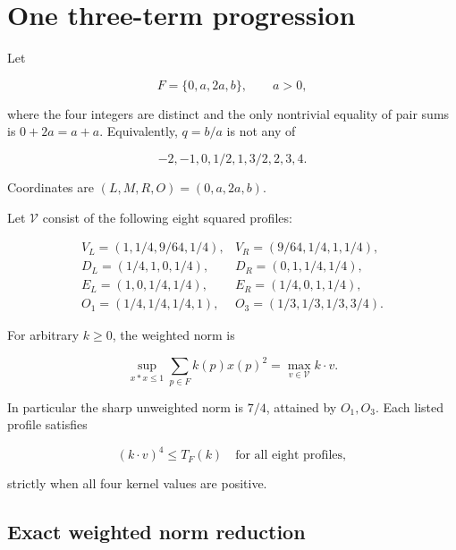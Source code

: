 \section{One three-term progression}
\label{sec:isolated}
Let

\[
F=\{0,a,2a,b\},\qquad a>0,
\]

where the four integers are distinct and the only nontrivial equality of pair
sums is \(0+2a=a+a\). Equivalently, \(q=b/a\) is not any of

\begin{equation}\label{eq:i1}
-2,-1,0,1/2,1,3/2,2,3,4.
\end{equation}

Coordinates are \((L,M,R,O)=(0,a,2a,b)\).

Let \(\mathcal V\) consist of the following eight squared profiles:

\begin{equation}\label{eq:i2}
\begin{array}{ll}
V_L=(1,1/4,9/64,1/4),&V_R=(9/64,1/4,1,1/4),\\
D_L=(1/4,1,0,1/4),&D_R=(0,1,1/4,1/4),\\
E_L=(1,0,1/4,1/4),&E_R=(1/4,0,1,1/4),\\
O_1=(1/4,1/4,1/4,1),&O_3=(1/3,1/3,1/3,3/4).
\end{array}
\end{equation}

\begin{proposition}\label{prop:isolated}
For arbitrary \(k\ge0\), the weighted norm is

\begin{equation}\label{eq:i3}
\sup_{x*x\le1}\sum_{p\in F}k(p)x(p)^2
=\max_{v\in\mathcal V}k\cdot v.
\end{equation}

In particular the sharp unweighted norm is \(7/4\), attained by \(O_1,O_3\).
Each listed profile satisfies

\begin{equation}\label{eq:i4}
(k\cdot v)^4\le T_F(k)\quad\text{for all eight profiles},
\end{equation}

strictly when all four kernel values are positive.
\end{proposition}

\subsection{Exact weighted norm reduction}

